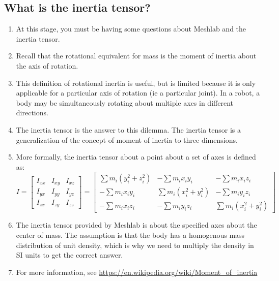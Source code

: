 \documentclass{article}
\begin{document}
        \subsection{What is the inertia tensor?}    
            \begin{enumerate}
                \item At this stage, you must be having some questions about Meshlab and the inertia tensor.
                \item Recall that the rotational equivalent for mass is the moment of inertia about
                the axis of rotation.
                \item This definition of rotational inertia is useful, but is limited because it 
                is only applicable for a particular axis of rotation (ie a particular joint). In a 
                robot, a body may be simultaneously rotating about multiple axes in different directions.
                \item The inertia tensor is the answer to this dilemma. The inertia tensor is a generalization 
                of the concept of moment of inertia to three dimensions.
                \item More formally, the inertia tensor about a point about a set of axes is defined as:
                \[
I =     \begin{bmatrix}
        I_{xx} & I_{xy} & I_{xz} \\
        I_{yx} & I_{yy} & I_{yz} \\
        I_{zx} & I_{zy} & I_{zz}
        \end{bmatrix}
  =     \begin{bmatrix}
        \sum m_{i}(y_{i}^2 + z_{i}^2) & -\sum m_{i}x_{i}y_{i} &-\sum m_{i}x_{i}z_{i} \\
        -\sum m_{i}x_{i}y_{i} & \sum m_{i}(x_{i}^2 + y_{i}^2) & -\sum m_{i}y_{i}z_{i}  \\
        -\sum m_{i}x_{i}z_{i} & -\sum m_{i}y_{i}z_{i} & \sum m_{i}(x_{i}^2 + y_{i}^2)
        \end{bmatrix}                    
                \]
                \item The inertia tensor provided by Meshlab is about the specified axes about the center of mass.
                The assumption is that the body has a homogenous mass distribution of unit density, which is 
                why we need to multiply the density in SI units to get the correct answer.
                \item For more information, see \url{https://en.wikipedia.org/wiki/Moment_of_inertia}
            \end{enumerate}
\end{document}
